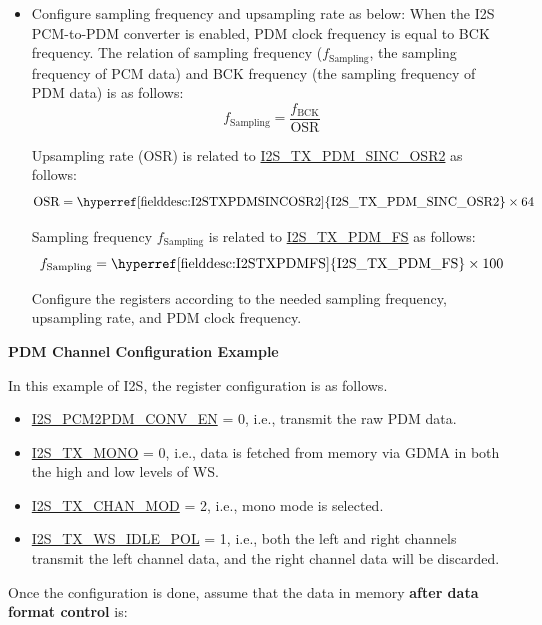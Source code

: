 \documentclass[main\_\_EN.tex]{subfiles}
\begin{document}
\begin{itemize}
    \item Configure sampling frequency and upsampling rate as below: \newline
    When the I2S PCM-to-PDM converter is enabled, PDM clock frequency is equal to BCK frequency. The relation of sampling frequency ($f_{\textrm{Sampling}}$, the sampling frequency of PCM data) and BCK frequency (the sampling frequency of PDM data) is as follows:
    $$f_{\textrm{Sampling}} = \frac{f_{\textrm{BCK}}}{\textrm{OSR}}$$
    
    Upsampling rate (OSR) is related to \hyperref[fielddesc:I2STXPDMSINCOSR2]{I2S\_TX\_PDM\_SINC\_OSR2} as follows:
    $${\textrm{OSR}} = {\textrm{\hyperref[fielddesc:I2STXPDMSINCOSR2]{I2S\_TX\_PDM\_SINC\_OSR2}}} \times {\textrm{64}}$$
    
    Sampling frequency $f_{\textrm{Sampling}}$ is related to \hyperref[fielddesc:I2STXPDMFS]{I2S\_TX\_PDM\_FS} as follows:
    $$f_{\textrm{Sampling}} = {\textrm{\hyperref[fielddesc:I2STXPDMFS]{I2S\_TX\_PDM\_FS}}} \times {\textrm{100}}$$
    
    Configure the registers according to the needed sampling frequency, upsampling rate, and PDM clock frequency.
\end{itemize}

\textbf{PDM Channel Configuration Example}

In this example of I2S, the register configuration is as follows.

\begin{itemize}
    \item \hyperref[fielddesc:I2SPCM2PDMCONVEN]{I2S\_PCM2PDM\_CONV\_EN} = 0, i.e., transmit the raw PDM data.
    \item \hyperref[fielddesc:I2STXMONO]{I2S\_TX\_MONO} = 0, i.e., data is fetched from memory via GDMA in both the high and low levels of WS.
    \item \hyperref[fielddesc:I2STXCHANMOD]{I2S\_TX\_CHAN\_MOD} = 2, i.e., mono mode is selected.
    \item \hyperref[fielddesc:I2STXWSIDLEPOL]{I2S\_TX\_WS\_IDLE\_POL} = 1, i.e., both the left and right channels transmit the left channel data, and the right channel data will be discarded.
\end{itemize}

Once the configuration is done, assume that the data in memory \textbf{after data format control} is:
\end{document}
